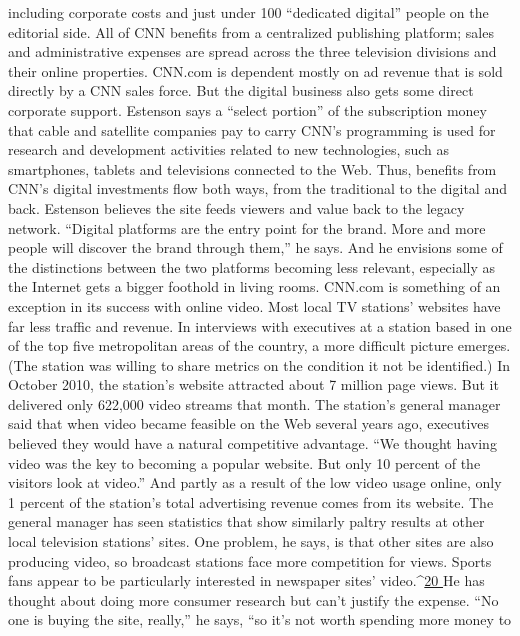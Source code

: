 including corporate costs and just under 100 ``dedicated digital'' people on the
editorial side. All of CNN benefits from a centralized publishing platform; sales
and administrative expenses are spread across the three television divisions and
their online properties.
CNN.com is dependent mostly on ad revenue that is sold directly by a CNN
sales force. But the digital business also gets some direct corporate support. Estenson
says a ``select portion'' of the subscription money that cable and satellite companies
pay to carry CNN’s programming is used for research and development
activities related to new technologies, such as smartphones, tablets and televisions
connected to the Web. Thus, benefits from CNN’s digital investments flow both
ways, from the traditional to the digital and back.
Estenson believes the site feeds viewers and value back to the legacy network.
``Digital platforms are the entry point for the brand. More and more people will
discover the brand through them,'' he says. And he envisions some of the distinctions
between the two platforms becoming less relevant, especially as the Internet
gets a bigger foothold in living rooms.
CNN.com is something of an exception in its success with online video. Most
local TV stations’ websites have far less traffic and revenue. In interviews with executives
at a station based in one of the top five metropolitan areas of the country,
a more difficult picture emerges. (The station was willing to share metrics on the
condition it not be identified.) In October 2010, the station’s website attracted
about 7 million page views. But it delivered only 622,000 video streams that
month. The station’s general manager said that when video became feasible on
the Web several years ago, executives believed they would have a natural competitive
advantage. ``We thought having video was the key to becoming a popular
website. But only 10 percent of the visitors look at video.'' And partly as a result
of the low video usage online, only 1 percent of the station’s total advertising
revenue comes from its website.
The general manager has seen statistics that show similarly paltry results at
other local television stations’ sites. One problem, he says, is that other sites are
also producing video, so broadcast stations face more competition for views.
Sports fans appear to be particularly interested in newspaper sites’ video.^{\href{#endnotes-ch4}{20 }}He has
thought about doing more consumer research but can’t justify the expense. ``No
one is buying the site, really,'' he says, ``so it’s not worth spending more money to
